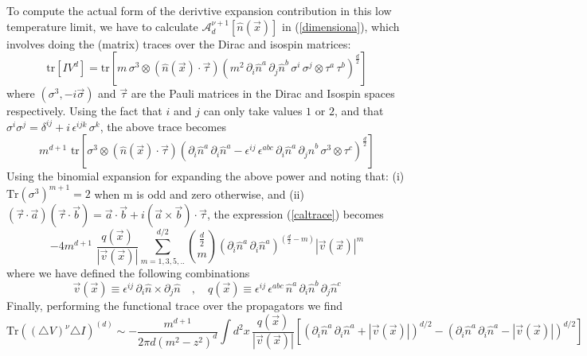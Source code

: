 \documentclass[a4paper,prd]{revtex4}
\begin{document}
To compute the actual form of the derivtive expansion contribution in this
low temperature limit, we  have to calculate
$\mathcal{A}_{d}^{\nu +1}[\hat{n}(\vec{x})]$ in (\ref{dimensiona}), which
involves doing the (matrix) traces over the Dirac and isospin matrices:
\begin{equation}
\textrm{tr}\left[I V^{d}\right]= \textrm{tr}\left[m\,
\sigma^{3}\otimes \left(\hat{n}(\vec{x})\cdot 
\vec{\tau}\right)\left(m^2\,  \partial_{i}\hat{n}^a
\,\partial_{j}\hat{n}^b\, \sigma^{i}\, \sigma^{j} \otimes \tau^{a}\,
\tau^{b}\right)^{\frac{d}{2}}\right]
\end{equation}
where $(\sigma^{3}, -i\vec{\sigma})$ and $\vec{\tau}$ are the Pauli matrices in 
the Dirac and Isospin spaces respectively. Using the fact that $i$ and $ j$ can only
take values $1$ or $2$, and that $\sigma^{i} \sigma^{j}=\delta^{ij}
+i\,\epsilon^{ijk}\,\sigma^{k}$, the above trace becomes
\begin{equation}
m^{d+1}\textrm{ tr}\left[\sigma^{3} \otimes
(\hat{n}(\vec{x})\cdot\vec{\tau})\left(\partial_{i}\hat{n}^{a}\,
\partial_{i}\hat{n}^{a}-\epsilon^{ij}\,\epsilon^{abc}\, \partial_{i}\hat{n}^a\,
\partial_{j}\hat{n}^b\, \sigma^{3} \otimes \tau^{c}\right)^{\frac{d}{2}}\right]
\label{caltrace}
\end{equation}
Using the binomial expansion for expanding the above power and noting
that:  (i) $\textrm{Tr}(\sigma^{3})^{m+1}=2$ when m is odd and zero
otherwise, and (ii)
$(\vec{\tau}\cdot \vec{a})(\vec{\tau}\cdot \vec{b})=\vec{a}\cdot \vec{b}+i
(\vec{a}\times\vec{b})\cdot\vec{\tau}$, the expression (\ref{caltrace})
becomes
\begin{equation}
-4 m^{d+1} \, \, \frac{q(\vec{x})}{|\vec{v}(\vec{x})|} \sum_{m=1, 3, 5, . . }^{d/2} 
{\frac{d}{2} \choose m}(\partial_{i}\hat{n}^{a}\,
\partial_{i}\hat{n}^{a})^{(\frac{d}{2} -m)} |\vec{v}(\vec{x})|^{m}
\end{equation}
where we have defined the following combinations
\begin{equation}
\vec{v}(\vec{x})\equiv \epsilon^{i j}\,\partial_{i} \hat{n} \times
\partial_{j} 
\hat{n}\quad  , \quad q(\vec{x})\equiv\epsilon^{i j}\, \epsilon^{abc}\,
\hat{n}^{a}\,
\partial_{i}\hat{n}^{b}\, \partial_{j} \hat{n}^{c}
\end{equation}
Finally, performing the functional trace over the propagators we find 
\begin{equation}
\textrm{Tr}((\triangle V)^{\nu}\triangle I)^{(d)}\sim -\frac{m^{d+1}}{2
\pi d  (m^2 -z^2)^{d}}\int d^{2}x\,
\frac{q(\vec{x})}{|\vec{v}(\vec{x})|}\left[\left(\partial_{i}\hat{n}^{a}\,
\partial_{i}\hat{n}^{a} +|\vec{v}(\vec{x})|\right)^{d/2} -\left(\partial_{i}\hat{n}^{a}\,
\partial_{i}\hat{n}^{a} -|\vec{v}(\vec{x})|\right)^{d/2}\right]
\label{dt}
\end{equation}
\end{document}
